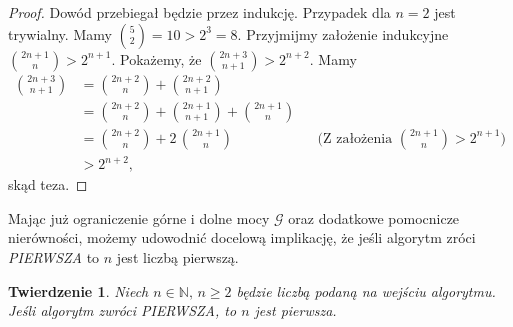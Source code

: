 \documentclass[polish,declaration,shortabstract]{iithesis}
\theoremstyle{definition}
\theoremstyle{remark} \newtheorem{observation}{Obserwacja}
\theoremstyle{plain} \newtheorem{theorem}{Twierdzenie}
\theoremstyle{plain} \newtheorem{lemma}{Lemat}
\theoremstyle{remark} \newtheorem*{remark*}{Uwaga}
\theoremstyle{reminder} \newtheorem*{reminder*}{Przypomnienie}
\begin{document}
\begin{proof}
	Dowód przebiegał będzie przez indukcję. Przypadek dla $n = 2$ jest trywialny. Mamy ${5 \choose 2} = 10 > 2^3 = 8.$\newline
	Przyjmijmy założenie indukcyjne ${2n + 1 \choose n} > 2^{n+1}$. Pokażemy, że ${2n + 3 \choose n + 1} > 2^{n+2}$. Mamy
	\begin{align*}
		{2n + 3 \choose n + 1} &= {2n + 2 \choose n} + {2n + 2 \choose n + 1} \\
		&= {2n + 2 \choose n} + {2n + 1 \choose n + 1} + {2n + 1 \choose n} \\
		  & = {2n + 2 \choose n} + 2\, {2n + 1 \choose n} &   & \text{(Z założenia ${2n + 1 \choose n} > 2^{n+1}$)} \\
		&> 2^{n+2},
	\end{align*}
	skąd teza.
\end{proof}

Mając już ograniczenie górne i dolne mocy $\mathcal{G}$ oraz dodatkowe pomocnicze nierówności, możemy udowodnić docelową implikację, że jeśli algorytm zróci \textit{PIERWSZA} to $n$ jest liczbą pierwszą.
	
\begin{theorem}\label{T1}
	Niech $n \in \mathbb{N}, \, n \geq 2$ będzie liczbą podaną na wejściu algorytmu. Jeśli algorytm zwróci \textit{PIERWSZA}, to $n$ jest pierwsza.
\end{theorem}
	
\end{document}
